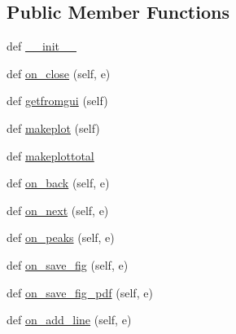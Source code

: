 \subsection*{Public Member Functions}
\begin{DoxyCompactItemize}
\item 
def \hyperlink{class_uni_dec_1_1unidec__modules_1_1_mass_defects_1_1_mass_defect_window_adb2a3ef6597b910fe5db19cb981abfce}{\+\_\+\+\_\+init\+\_\+\+\_\+}
\item 
def \hyperlink{class_uni_dec_1_1unidec__modules_1_1_mass_defects_1_1_mass_defect_window_a0f1677916fb012e435fe3e4b477a8b58}{on\+\_\+close} (self, e)
\item 
def \hyperlink{class_uni_dec_1_1unidec__modules_1_1_mass_defects_1_1_mass_defect_window_ae13b14a55176c3948e790ce3f14bb491}{getfromgui} (self)
\item 
def \hyperlink{class_uni_dec_1_1unidec__modules_1_1_mass_defects_1_1_mass_defect_window_a94573d37d64c826e9fb7ef98eec7b0c0}{makeplot} (self)
\item 
def \hyperlink{class_uni_dec_1_1unidec__modules_1_1_mass_defects_1_1_mass_defect_window_ab88d882e4f865c7951d46536c8669e22}{makeplottotal}
\item 
def \hyperlink{class_uni_dec_1_1unidec__modules_1_1_mass_defects_1_1_mass_defect_window_af05aa55fe6eb81b344fa6c1e1379ffed}{on\+\_\+back} (self, e)
\item 
def \hyperlink{class_uni_dec_1_1unidec__modules_1_1_mass_defects_1_1_mass_defect_window_ae3b8cd82bd0a5801cfaf56ff79a90749}{on\+\_\+next} (self, e)
\item 
def \hyperlink{class_uni_dec_1_1unidec__modules_1_1_mass_defects_1_1_mass_defect_window_abb745eec3107394dfd8ee47be33593e2}{on\+\_\+peaks} (self, e)
\item 
def \hyperlink{class_uni_dec_1_1unidec__modules_1_1_mass_defects_1_1_mass_defect_window_a7be0fd3ad4c8007f02d901c3c1981332}{on\+\_\+save\+\_\+fig} (self, e)
\item 
def \hyperlink{class_uni_dec_1_1unidec__modules_1_1_mass_defects_1_1_mass_defect_window_a35f4c84adbf0ee9a18fc3b00e7adbc82}{on\+\_\+save\+\_\+fig\+\_\+pdf} (self, e)
\item 
def \hyperlink{class_uni_dec_1_1unidec__modules_1_1_mass_defects_1_1_mass_defect_window_a97d7d1ade41755c26b52fe889c58835d}{on\+\_\+add\+\_\+line} (self, e)
\end{DoxyCompactItemize}
